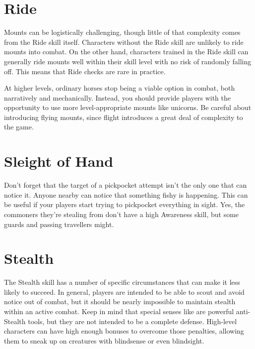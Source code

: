 \section{Ride}
  Mounts can be logistically challenging, though little of that complexity comes from the Ride skill itself.
  Characters without the Ride skill are unlikely to ride mounts into combat.
  On the other hand, characters trained in the Ride skill can generally ride mounts well within their skill level with no risk of randomly falling off.
  This means that Ride checks are rare in practice.

  At higher levels, ordinary horses stop being a viable option in combat, both narratively and mechanically.
  Instead, you should provide players with the opportunity to use more level-appropriate mounts like unicorns.
  Be careful about introducing flying mounts, since flight introduces a great deal of complexity to the game.

\section{Sleight of Hand}
  Don't forget that the target of a pickpocket attempt isn't the only one that can notice it.
  Anyone nearby can notice that something fishy is happening.
  This can be useful if your players start trying to pickpocket everything in sight.
  Yes, the commoners they're stealing from don't have a high Awareness skill, but some guards and passing travellers might.


\section{Stealth}
  The Stealth skill has a number of specific circumstances that can make it less likely to succeed.
  In general, players are intended to be able to scout and avoid notice out of combat, but it should be nearly impossible to maintain stealth within an active combat.
  Keep in mind that special senses like  are powerful anti-Stealth tools, but they are not intended to be a complete defense.
  High-level characters can have high enough bonuses to overcome those penalties, allowing them to sneak up on creatures with blindsense or even blindsight.

